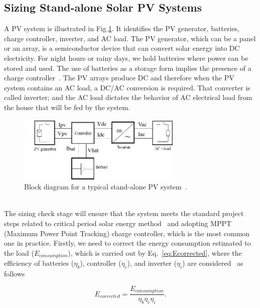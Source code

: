 \documentclass[review]{elsarticle}
\begin{document}
\subsection{Sizing Stand-alone Solar PV Systems}
\label{sec:sizing}
A PV system is illustrated in Fig.\ref{fig:blockdiagram}. It identifies the PV generator, batteries, charge controller, inverter, and AC load. 
The PV generator, which can be a panel or an array, is a semiconductor device that can convert solar energy into DC electricity. %
For night hours or rainy days, we hold batteries where power can be stored and used. The use of batteries as a storage form implies the presence of a charge controller~\cite{Hansen}. The PV arrays produce DC and therefore when the PV system contains an AC load, a DC/AC conversion is required. That converter is called inverter; and the AC load dictates the behavior of AC electrical load from the house that will be fed by the system.
\begin{figure}[h]
\includegraphics[width=0.7\textwidth]{blockdiagramPVS2_rev}
\centering
\caption{Block diagram for a typical stand-alone PV system~\cite{Hansen}.}
\label{fig:blockdiagram} 
\end{figure}
\\
%
The sizing check stage will ensure that the system meets the standard project steps related to critical period solar energy method~\cite{Pinho} and adopting MPPT (Maximum Power Point Tracking) charge controller, which is the most common one in practice. 
%
Firstly, we need to correct the energy consumption estimated to the load ($E_{consumption}$), which is carried out by Eq.~\eqref{eq:Ecorrected}, where the efficiency of batteries ($\eta_{b}$), controller ($\eta_{c}$), and inverter ($\eta_{i}$) are considered~\cite{Pinho} as follows

\begin{equation}
\label{eq:Ecorrected}
E_{corrected} = \dfrac{E_{consumption}}{\eta_{b} \eta_{c} \eta_{i} }.
\end{equation}
\end{document}
